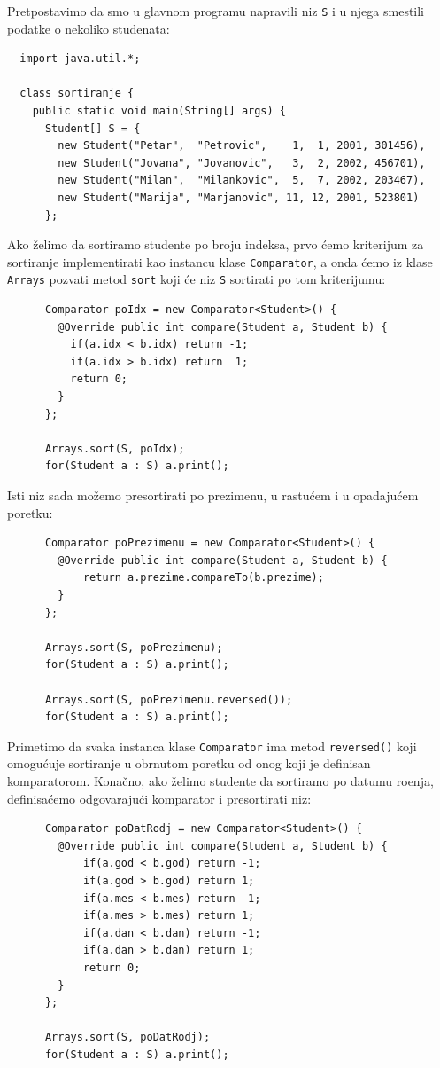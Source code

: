 Pretpostavimo da smo u glavnom programu napravili niz \texttt{S} i u njega smestili podatke
o nekoliko studenata:
{\small
\begin{verbatim}
  import java.util.*;

  class sortiranje {
    public static void main(String[] args) {
      Student[] S = {
        new Student("Petar",  "Petrovic",    1,  1, 2001, 301456),
        new Student("Jovana", "Jovanovic",   3,  2, 2002, 456701),
        new Student("Milan",  "Milankovic",  5,  7, 2002, 203467),
        new Student("Marija", "Marjanovic", 11, 12, 2001, 523801)
      };
\end{verbatim}
}
Ako \v zelimo da sortiramo studente po broju indeksa, prvo \'cemo kriterijum za sortiranje
implementirati kao instancu klase \texttt{Comparator}, a onda \'cemo iz klase \texttt{Arrays}
pozvati metod \texttt{sort} koji \'ce niz \texttt{S} sortirati po tom kriterijumu:
{\small
\begin{verbatim}
      Comparator poIdx = new Comparator<Student>() {
        @Override public int compare(Student a, Student b) {
          if(a.idx < b.idx) return -1;
          if(a.idx > b.idx) return  1;
          return 0;
        }
      };

      Arrays.sort(S, poIdx);
      for(Student a : S) a.print();
\end{verbatim}
}
Isti niz sada mo\v zemo presortirati po prezimenu, u rastu\'cem i u opadaju\'cem poretku:
{\small
\begin{verbatim}
      Comparator poPrezimenu = new Comparator<Student>() {
        @Override public int compare(Student a, Student b) {
            return a.prezime.compareTo(b.prezime);
        }
      };

      Arrays.sort(S, poPrezimenu);
      for(Student a : S) a.print();
    
      Arrays.sort(S, poPrezimenu.reversed());
      for(Student a : S) a.print();
\end{verbatim}
}
Primetimo da svaka instanca klase \texttt{Comparator} ima metod \texttt{reversed()}
koji omogu\'cuje sortiranje u obrnutom poretku od onog koji je definisan komparatorom.
Kona\v cno, ako \v zelimo studente da sortiramo po datumu ro\dj enja, definisa\'cemo odgovaraju\'ci
komparator i presortirati niz:
{\small
\begin{verbatim}
      Comparator poDatRodj = new Comparator<Student>() {
        @Override public int compare(Student a, Student b) {
            if(a.god < b.god) return -1;
            if(a.god > b.god) return 1;
            if(a.mes < b.mes) return -1;
            if(a.mes > b.mes) return 1;
            if(a.dan < b.dan) return -1;
            if(a.dan > b.dan) return 1;
            return 0;
        }
      };
    
      Arrays.sort(S, poDatRodj);
      for(Student a : S) a.print();
\end{verbatim}
}
